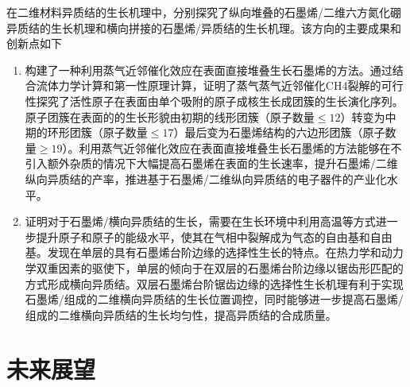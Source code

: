 在二维材料异质结的生长机理中，分别探究了纵向堆叠的石墨烯/二维六方氮化硼异质结的生长机理和横向拼接的石墨烯/异质结的生长机理。该方向的主要成果和创新点如下\chinesecolon
\begin{enumerate}[label=（\arabic*）,wide]
    \item 构建了一种利用蒸气近邻催化效应在表面直接堆叠生长石墨烯的方法。通过结合流体力学计算和第一性原理计算，证明了蒸气蒸气近邻催化CH4裂解的可行性探究了活性原子在表面由单个吸附的原子成核生长成团簇的生长演化序列。原子团簇在表面的的生长形貌由初期的线形团簇（原子数量$\leqslant 12$）转变为中期的环形团簇（原子数量$\leqslant 17$）最后变为石墨烯结构的六边形团簇（原子数量$\geqslant 19$）。利用蒸气近邻催化效应在表面直接堆叠生长石墨烯的方法能够在不引入额外杂质的情况下大幅提高石墨烯在表面的生长速率，提升石墨烯/二维纵向异质结的产率，推进基于石墨烯/二维纵向异质结的电子器件的产业化水平。
    \item 证明对于石墨烯/横向异质结的生长，需要在生长环境中利用高温等方式进一步提升原子和原子的能级水平，使其在气相中裂解成为气态的自由基和自由基。发现在单层的具有石墨烯台阶边缘的选择性生长的特点。在热力学和动力学双重因素的驱使下，单层的倾向于在双层的石墨烯台阶边缘以锯齿形匹配的方式形成横向异质结。双层石墨烯台阶锯齿边缘的选择性生长机理有利于实现石墨烯/组成的二维横向异质结的生长位置调控，同时能够进一步提高石墨烯/组成的二维横向异质结的生长均匀性，提高异质结的合成质量。
\end{enumerate}

\section{未来展望}

